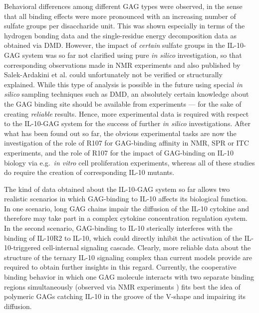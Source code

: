 Behavioral differences among different GAG types were observed, in the sense
that all binding effects were more pronounced with an increasing number of
sulfate groups per disaccharide unit. This was shown especially in terms of the
hydrogen bonding data and the single-residue energy decomposition data as
obtained via DMD. However, the impact of \textit{certain} sulfate groups in the
IL-10-GAG system was so far not clarified using pure \textit{in silico}
investigation, so that corresponding observations made in NMR experiments and
also published by Salek-Ardakini et al. \cite{salek_ardakani_2000} could
unfortunately not be verified or structurally explained. While this type of
analysis is possible in the future using special \textit{in silico} sampling
techniques such as DMD, an absolutely certain knowledge about the GAG binding
site should be available from experiments --- for the sake of creating
\textit{reliable} results. Hence, more experimental data is required with
respect to the IL-10-GAG system for the success of further \textit{in silico}
investigations. After what has been found out so far, the obvious experimental
tasks are now the investigation of the role of R107 for GAG-binding affinity in
NMR, SPR or ITC experiments, and the role of R107 for the impact of GAG-binding
on IL-10 biology via e.g.\ \textit{in vitro} cell proliferation experiments,
whereas all of these studies do require the creation of corresponding IL-10
mutants.

The kind of data obtained about the IL-10-GAG system so far allows two realistic
scenarios in which GAG-binding to IL-10 affects its biological function. In one
scenario, long GAG chains impair the diffusion of the IL-10 cytokine and
therefore may take part in a complex cytokine concentration regulation system.
In the second scenario, GAG-binding to IL-10 sterically interferes with the
binding of IL-10R2 to IL-10, which could directly inhibit the activation of the
IL-10-triggered cell-internal signaling cascade. Clearly, more reliable data
about the structure of the ternary IL-10 signaling complex than current models
provide are required to obtain further insights in this regard. Currently, the
cooperative binding behavior in which one GAG molecule interacts with two
separate binding regions simultaneously (observed via NMR experiments
\cite{kuenze_gehrcke_2014}) fits best the idea of polymeric GAGs catching IL-10
in the groove of the V-shape and impairing its diffusion.


